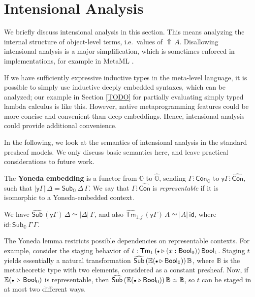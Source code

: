 \documentclass[acmsmall]{acmart}
\newcommand{\msf}[1]{\mathsf{#1}}
\newcommand{\mbb}[1]{\mathbb{#1}}
\newcommand{\wh}[1]{\widehat{#1}}
\newcommand{\ext}{\triangleright}
\newcommand{\Lift}{{\Uparrow}}
\newcommand{\mbbo}{\mbb{O}}
\newcommand{\Tm}{\msf{Tm}}
\newcommand{\Cono}{\msf{Con}_{\mbbo}}
\newcommand{\Subo}{\msf{Sub}_{\mbbo}}
\newcommand{\hCon}{\wh{\msf{Con}}}
\newcommand{\hSub}{\wh{\msf{Sub}}}
\newcommand{\hTm}{\wh{\msf{Tm}}}
\newcommand{\Bool}{\msf{Bool}}
\newcommand{\emptycon}{\scaleobj{.75}\bullet}
\newcommand{\id}{\msf{id}}
\newcommand{\hato}{\bm\hat{\mbbo}}
\newcommand{\ev}{\mbb{E}}
\theoremstyle{remark}
\begin{document}
\section{Intensional Analysis}\label{sec:intensional-analysis}

We briefly discuss intensional analysis in this section. This means analyzing
the internal structure of object-level terms, i.e.\ values of $\Lift\,A$. Disallowing
intensional analysis is a major simplification, which is sometimes enforced
in implementations, for example in MetaML \cite{metaml}.

If we have sufficiently expressive inductive types in the meta-level language,
it is possible to simply use inductive deeply embedded syntaxes, which can be
analyzed; our example in Section \ref{TODO} for partially evaluating simply
typed lambda calculus is like this. However, native metaprogramming features
could be more concise and convenient than deep embeddings. Hence, intensional
analysis could provide additional convenience.

In the following, we look at the semantics of intensional analysis in the
standard presheaf models. We only discuss basic semantics here, and leave
practical considerations to future work.

\begin{definition}
The \textbf{Yoneda embedding} is a functor from $\mbbo$ to $\hato$, sending
$\Gamma : \Cono$ to $\msf{y}\Gamma : \hCon$, such that $|\msf{y}\Gamma|\,\Delta
= \Subo\,\Delta\,\Gamma$. We say that $\Gamma : \hCon$ is \emph{representable}
if it is isomorphic to a Yoneda-embedded context.
\end{definition}

\begin{lemma}
We have $\hSub\,(\msf{y}\Gamma)\,\Delta \simeq |\Delta|\,\Gamma$, and also
$\hTm_{1,j}\,(\msf{y}\Gamma)\,A \simeq |A|\,\id$, where $\id :
\Subo\,\Gamma\,\Gamma$.
\end{lemma}

The Yoneda lemma restricts possible dependencies on representable contexts.  For
example, consider the staging behavior of $t : \Tm_{1}\,(\emptycon \ext (x :
\Bool_0))\,\Bool_1$. Staging $t$ yields essentially a natural transformation
$\hSub\,(\ev(\emptycon \ext \Bool_0))\,\mbb{B}$, where $\mbb{B}$ is the
metatheoretic type with two elements, considered as a constant presheaf.  Now,
if $\ev(\emptycon\,\ext\, \Bool_0)$ is representable, then
$\hSub\,(\ev(\emptycon \ext \Bool_0))\,\mbb{B} \simeq \mbb{B}$, so $t$ can be
staged in at most two different ways.
\end{document}
